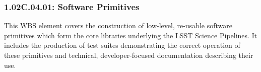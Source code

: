 \subsubsection*{1.02C.04.01: Software Primitives}

This WBS element covers the construction of low-level, re-usable software
primitives which form the core libraries underlying the LSST Science
Pipelines. It includes the production of test suites demonstrating the correct
operation of these primitives and technical, developer-focused documentation
describing their use.
